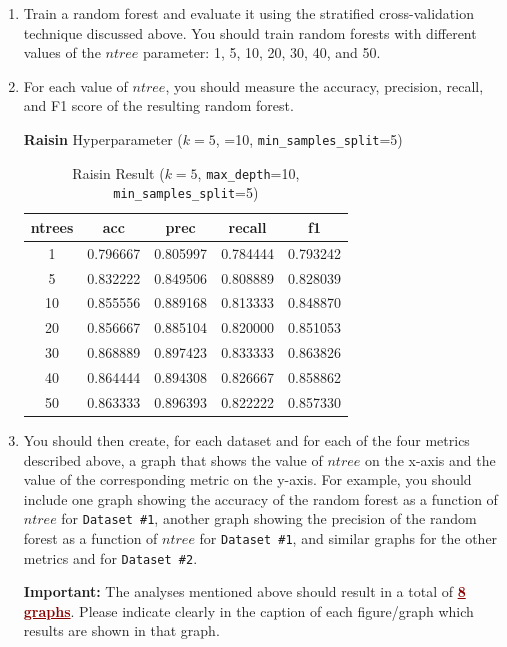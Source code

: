 \documentclass{article}
\begin{document}
\begin{enumerate}
    \item Train a random forest and evaluate it using the stratified cross-validation technique discussed above. You should train random forests with different values of the $ntree$ parameter: 1, 5, 10, 20, 30, 40, and 50.

    \item For each value of $ntree$, you should measure the accuracy, precision, recall, and F1 score of the resulting random forest. 

\noindent \textbf{Raisin} Hyperparameter ($k=5$, =10, \texttt{min\_samples\_split}=5)

\begin{table}[htbp]
\centering
\caption{Raisin Result ($k=5$, \texttt{max\_depth}=10, \texttt{min\_samples\_split}=5)}
\label{tab:raisin_result}
\begin{tabular}{ccccc}
\toprule
ntrees & acc & prec & recall & f1 \\
\midrule
1  & 0.796667 & 0.805997 & 0.784444 & 0.793242 \\
5  & 0.832222 & 0.849506 & 0.808889 & 0.828039 \\
10 & 0.855556 & 0.889168 & 0.813333 & 0.848870 \\
20 & 0.856667 & 0.885104 & 0.820000 & 0.851053 \\
30 & 0.868889 & 0.897423 & 0.833333 & 0.863826 \\
40 & 0.864444 & 0.894308 & 0.826667 & 0.858862 \\
50 & 0.863333 & 0.896393 & 0.822222 & 0.857330 \\
\bottomrule
\end{tabular}
\end{table}


\newpage
    \item You should then create, for each dataset and for each of the four metrics described above, a graph that shows the value of $ntree$ on the x-axis and the value of the corresponding metric on the y-axis. For example, you should include one graph showing the accuracy of the random forest as a function of $ntree$ for \texttt{Dataset \#1}, another graph showing the precision of the random forest as a function of $ntree$ for \texttt{Dataset \#1}, and similar graphs for the other metrics and for \texttt{Dataset \#2}.
    \begin{mybox}[boxpink] 
    \textbf{Important:} The analyses mentioned above should result in a total of \textcolor{darkred}{\ul{\textbf{8 graphs}}}. Please indicate clearly in the caption of each figure/graph which results are shown in that graph.
    \end{mybox}


\end{enumerate}
\end{document}
